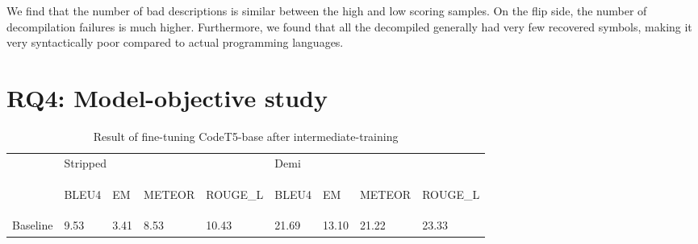We find that the number of bad descriptions is similar between the high and low scoring samples. On the flip side, the number of decompilation failures is much higher.
Furthermore, we found that all the decompiled generally had very few recovered symbols, making it very syntactically poor compared to actual programming languages.


\section{RQ4: Model-objective study}
\label{tab:intermediate}
\begin{table}[!h]
\centering
\caption{Result of fine-tuning CodeT5-base after intermediate-training}
\begin{tabular}{l|llll|llll}
\rowcolor[rgb]{0.749,0.749,0.749} \multicolumn{1}{l}{} & \multicolumn{4}{l|}{Stripped}                                                                                                                        & Demi                               &                                  &                                      &                                       \\ 
\cline{2-9}
\begin{sideways}\textbf{}\end{sideways}                & \begin{sideways}BLEU4\end{sideways} & \begin{sideways}EM\end{sideways} & \begin{sideways}METEOR\end{sideways} & \begin{sideways}ROUGE\_L\end{sideways} & \begin{sideways}BLEU4\end{sideways} & \begin{sideways}EM\end{sideways} & \begin{sideways}METEOR\end{sideways} & \begin{sideways}ROUGE\_L\end{sideways}  \\ 
\hline
Baseline                                               & 9.53                                & 3.41                          & 8.53                                & 10.43                                   & 21.69                              & 13.10  & 21.22                                & 23.33                                                           \\

\end{tabular}
\end{table}

